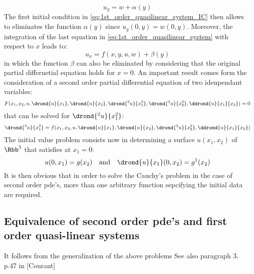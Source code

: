 \begin{equation*}
  u_y = w + \alpha(y)  
\end{equation*}
The first initial condition in \ref{eq:1st_order_quasilinear_system_IC} then allows to eliminates the function $\alpha(y)$ since $u_y(0,y)=w(0,y)$. Moreover, the integration of the last equation in \ref{eq:1st_order_quasilinear_system} with respect to $x$ leads to:
\begin{equation*}
  u_x = f(x,y,u,w) + \beta(y)
\end{equation*}
in which the function $\beta$ can also be eliminated by considering that the original partial differnetial equation holds for $x=0$.
An important result comes form the consideration of a second order partial differential equation of two idenpendant variables:
\begin{equation}
  \label{eq:2nd_order_pde}
  F(x_1,x_2,u,\drond{u}{x_1},\drond{u}{x_2},\drond{^2u}{x^2_1},\drond{^2u}{x^2_2},\ddrond{u}{x_1}{ x_2})=0
\end{equation}
that can be solved for $\drond{^2u}{x^2_1}$:
\begin{equation}
  \label{eq:2nd_order_pde_normal}
  \drond{^2u}{x^2_1} = f(x_1,x_2,u,\drond{u}{x_1},\drond{u}{x_2},\drond{^2u}{x^2_2},\ddrond{u}{x_1}{ x_2})
\end{equation}
The initial value problem consists now in determining a surface $u(x_1,x_2)$ of $\Rbb^3$ that satisfies at $x_1=0$:
\begin{equation}
  \label{eq:IC_Cauchy_2ndorder}
  u(0,x_1)=g(x_2) \quad \text{and} \quad \drond{u}{x_1}(0,x_2)=g^1(x_2)
\end{equation}
It is then obvious that in order to solve the Cauchy's problem in the case of second order pde's, more than one arbitrary function sepcifying the initial data are required. 
\subsection{Equivalence of second order pde's and first order quasi-linear systems}
\cite[p.43]{Courant}It follows from the generalization of the above problems
See also paragraph 3. p.47 in [Courant]
